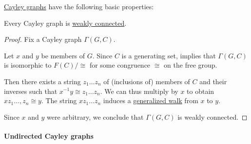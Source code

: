 \begin{proposition}\label{thm:def:cayley_graph}
  \hyperref[def:cayley_graph]{Cayley graphs} have the following basic properties:
  \begin{thmenum}
     Every Cayley graph is \hyperref[def:graph_connectedness/weak]{weakly connected}.
  \end{thmenum}
\end{proposition}
\begin{proof}
   Fix a Cayley graph \( \Gamma(G, C) \).

  Let \( x \) and \( y \) be members of \( G \). Since \( C \) is a generating set,  implies that \( \Gamma(G, C) \) is isomorphic to \( F(C) / {\cong} \) for some congruence \( {\cong} \) on the free group.

  Then there exists a string \( z_1 \ldots z_n \) of (inclusions of) members of \( C \) and their inverses such that \( x^{-1} y \cong z_1 \ldots z_n \). We can thus multiply by \( x \) to obtain \( x z_1 \ldots, z_n \cong y \). The string \( x z_1 \ldots z_n \) induces a \hyperref[def:graph_walk/generalized]{generalized walk} from \( x \) to \( y \).

  Since \( x \) and \( y \) were arbitrary, we conclude that \( \Gamma(G, C) \) is weakly connected.
\end{proof}

\paragraph{Undirected Cayley graphs}

